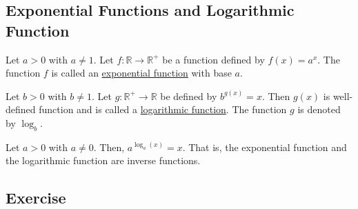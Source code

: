 \documentclass[11pt]{book}
\theoremstyle{break}
\theoremstyle{no_label}
\newcommand{\bbR}{\mathbb{R}}
\numberwithin{equation}{section}
\begin{document}
\subsection*{Exponential Functions and Logarithmic Function}

\begin{definition}
    Let $a>0$ with $a\ne1$. Let $f:\bbR\to\bbR^+$ be a function defined by $f(x)=a^x$. The function $f$ is called an \underline{exponential function} with base $a$.
\end{definition}

\begin{definition}
    Let $b>0$ with $b\ne 1$. Let $g:\bbR^+\to\bbR$ be defined by $b^{g(x)}=x$. Then $g(x)$ is well-defined function and is called a \underline{logarithmic function}. The function $g$ is denoted by $\log_b$.
\end{definition}

\begin{theorem}
    Let $a>0$ with $a\ne 0$. Then, $a^{\log_a(x)}=x$. That is, the exponential function and the logarithmic function are inverse functions.
\end{theorem}

\subsection*{Exercise}
\end{document}
